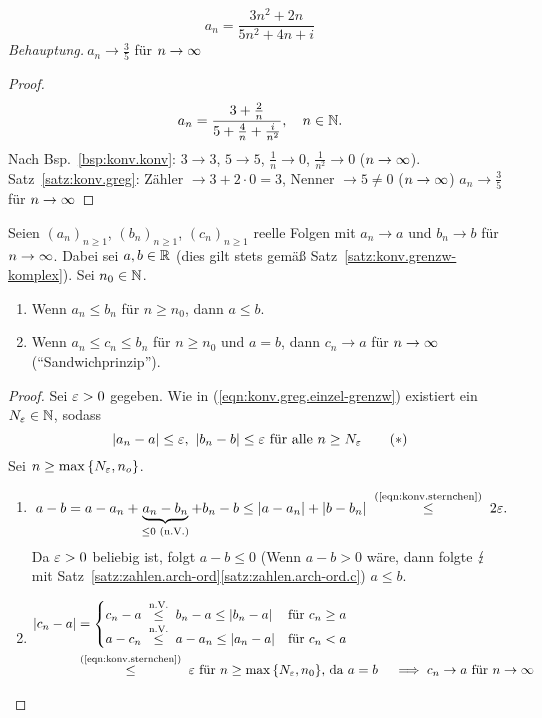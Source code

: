 \documentclass[12pt]{scrreprt}
\begin{document}
\begin{bsp}
  \label{bsp:konv.greg}
  \[a_n = \frac{3n^2+2n}{5n^2+4n+i}\] \emph{Behauptung.}$\
  a_n\to\frac35$ für $n\rightarrow\infty$
  \begin{proof}
    \[a_n=\frac{3+\frac{2}{n}}{5+\frac{4}{n}+\frac{i}{n^2}},\quad n\in\mathbb{N}.\]
    Nach Bsp.~\ref{bsp:konv.konv}: $3\to3$, $5\to5$,
    $\frac{1}{n}\to0$, $\frac{1}{n^2}\to0$
    ($n\rightarrow\infty$). Satz~\ref{satz:konv.greg}: Zähler $\to 3+2\cdot0=3$,
    Nenner $\to 5\ne0$ ($n\rightarrow\infty$)
    $a_n\to\frac35$ für $n\rightarrow\infty$
  \end{proof}
\end{bsp}

\begin{satz}
  \label{satz:konv.grenzw-ordn}
  Seien $(a_n)_{n\ge1}$, $(b_n)_{n\ge1}$, $(c_n)_{n\ge1}$ reelle
  Folgen mit $a_n \to a$ und $b_n \to b$ für $n\rightarrow\infty$. Dabei sei $a,
  b\in\mathbb{R}$ (dies gilt stets gemäß
  Satz~\ref{satz:konv.grenzw-komplex}). Sei $n_0\in\mathbb{N}$.
  \begin{enumerate}
  \item Wenn $a_n\le b_n$ für $n\ge n_0$, dann $a\le
    b$. \label{satz:konv.grenzw-ordn.a}
  \item Wenn $a_n\le c_n\le b_n$ für $n\ge n_0$ und $a=b$, dann
    $c_n\to a$ für $n\rightarrow\infty$
    ("`Sandwichprinzip"'). \label{satz:konv.grenzw-ordn.b}
  \end{enumerate}
\end{satz}
\begin{proof}
  Sei $\varepsilon>0$ gegeben. Wie in (\ref{eqn:konv.greg.einzel-grenzw})
  existiert ein $N_\varepsilon\in\mathbb{N}$, sodass
  \begin{equation}\left\lvert a_n-a\right\lvert\le\varepsilon\text{, }\left\lvert b_n-b\right\lvert\le\varepsilon\text{
      für alle }n\ge N_\varepsilon \label{eqn:konv.sternchen}\tag
    {$*$} \end{equation}
  Sei $n\ge\max{\{N_\varepsilon, n_o\}}$.
  \begin{enumerate}
  \item \[a-b = a-a_n+\underbrace{a_n-b_n}_{\le0\text{ (n.V.)}}+b_n-b
    \le \abs{a-a_n}+\abs{b-b_n} \nach{\le}{(\ref{eqn:konv.sternchen})}
    2\ep.\] Da $\varepsilon>0$ beliebig ist, folgt $a-b\le0$ (Wenn $a-b>0$
    wäre, dann folgte $\lightning$ mit
    Satz~\ref{satz:zahlen.arch-ord}\ref{satz:zahlen.arch-ord.c})
    \folgt $a\le b$.
  \item
    \begin{align*}
      \abs{c_n-a}&=\begin{cases} c_n-a \nach{\le}{n.V.} b_n-a \le
        \abs{b_n-a} & \text{für }c_n\ge a\\a-c_n \nach{\le}{n.V.}
        a-a_n \le \abs{a_n-a} & \text{für }c_n<a \end{cases}\\
      &\negthickspace\nach{\le}{(\ref{eqn:konv.sternchen})}\ep \text{
        für }n\ge\max{\{N_\ep,n_0\}}\text{, da }a=b \quad\folgt c_n\to
      a\text{ für }\ninf
    \end{align*}
  \end{enumerate}
\end{proof}
\end{document}
